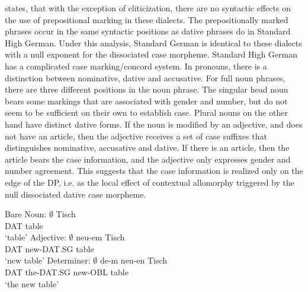 \cite{Seiler.2003} states, that with the exception of cliticization, there are no syntactic effects on the use of prepositional marking in these dialects. The prepositionally marked phrases occur in the same syntactic positions as dative phrases do in Standard High German. Under this analysis, Standard German is identical to these dialects with a null exponent for the dissociated case morpheme. Standard High German has a complicated case marking/concord system. In pronouns, there is a distinction between nominative, dative and accusative. For full noun phrases, there are three different positions in the noun phrase. The singular head noun bears some markings that are associated with gender and number, but do not seem to be sufficient on their own to establish case. Plural nouns on the other hand have distinct dative forms. If the noun is modified by an adjective, and does not have an article, then the adjective receives a set of case suffixes that distinguishes nominative, accusative and dative. If there is an article, then the article bears the case information, and the adjective only expresses gender and number agreement. This suggests that the case information is realized only on the edge of the DP, i.e. as the local effect of contextual allomorphy triggered by the null dissociated dative case morpheme.

\begin{exe}
\ex
\begin{xlist}
\ex Bare Noun:
\gll $\emptyset$ Tisch\\
DAT table\\
`table'
\ex Adjective:
\gll $\emptyset$ neu-em Tisch\\
DAT new-DAT.SG table\\
`new table'
\ex Determiner:
$\emptyset$ de-m neu-en Tisch\\
DAT the-DAT.SG new-OBL table\\
`the new table'
\end{xlist}
\end{exe}

